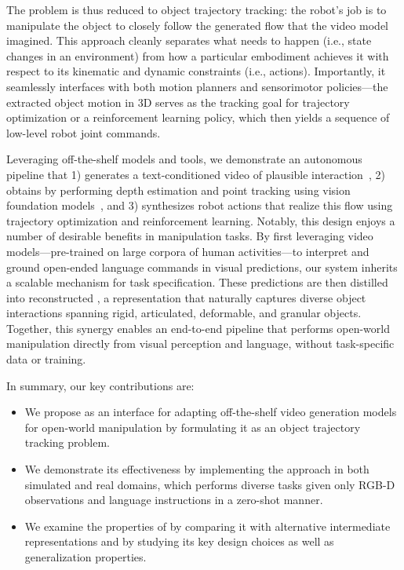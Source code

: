 The problem is thus reduced to object trajectory tracking: the robot’s job is to manipulate the object to closely follow the generated flow that the video model imagined. This approach cleanly separates what needs to happen (i.e., state changes in an environment) from how a particular embodiment achieves it with respect to its kinematic and dynamic constraints (i.e., actions). Importantly, it seamlessly interfaces with both motion planners and sensorimotor policies---the extracted object motion in 3D serves as the tracking goal for trajectory optimization or a reinforcement learning policy, which then yields a sequence of low-level robot joint commands.

Leveraging off-the-shelf models and tools, we demonstrate an autonomous pipeline that 1) generates a text-conditioned video of plausible interaction~\cite{brooks2024video}, 2) obtains \flow by performing depth estimation and point tracking using vision foundation models~\cite{ravi2024sam2,karaev2024cotracker3}, and 3) synthesizes robot actions that realize this flow using trajectory optimization and reinforcement learning.
Notably, this design enjoys a number of desirable benefits in manipulation tasks. By first leveraging video models---pre-trained on large corpora of human activities---to interpret and ground open-ended language commands in visual predictions, our system inherits a scalable mechanism for task specification. These predictions are then distilled into reconstructed \flow, a representation that naturally captures diverse object interactions spanning rigid, articulated, deformable, and granular objects. Together, this synergy enables an end-to-end pipeline that performs open-world manipulation directly from visual perception and language, without task-specific data or training.

In summary, our key contributions are:
\begin{itemize}
    \item We propose \flow as an interface for adapting off-the-shelf video generation models for open-world manipulation by formulating it as an object trajectory tracking problem.
    \item We demonstrate its effectiveness by implementing the approach in both simulated and real domains, which performs diverse tasks given only RGB-D observations and language instructions in a zero-shot manner.
    \item We examine the properties of \flow by comparing it with alternative intermediate representations and by studying its key design choices as well as generalization properties.
\end{itemize}
